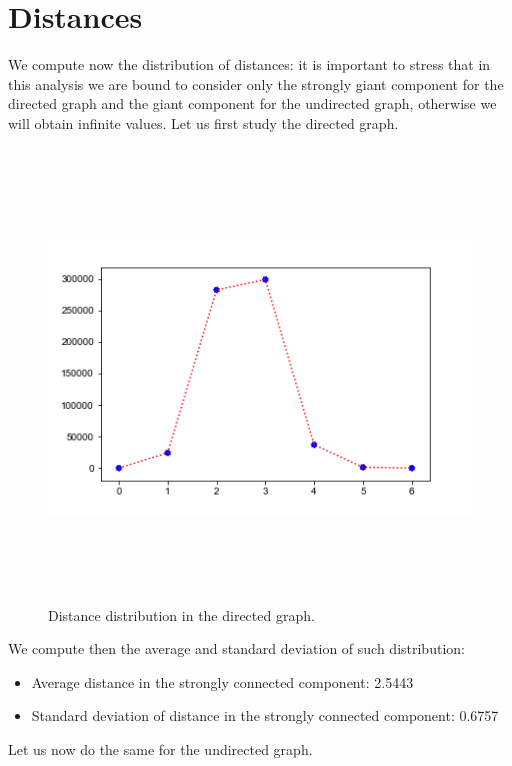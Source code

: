 \documentclass{report}
\theoremstyle{definition}
\theoremstyle{remark}
\begin{document}
\section*{Distances}
We compute now the distribution of distances: it is important to stress that in this analysis we are bound to consider only the strongly giant component for the directed graph and the giant component for the undirected graph, otherwise we will obtain infinite values. Let us first study the directed graph.
\begin{figure} [H]
	\centering
	\centerline{\includegraphics[width = 13cm, height = 12cm, keepaspectratio]{distance_distribution.png}}
	\label{Dist}
	\caption{Distance distribution in the directed graph.}
\end{figure}
 We compute then the average and standard deviation of such distribution:
 \begin{itemize}
 	\item Average distance in the strongly connected component: 2.5443
 	\item Standard deviation of distance in the strongly connected component: 0.6757
 \end{itemize}
Let us now do the same for the undirected graph.
\end{document}

